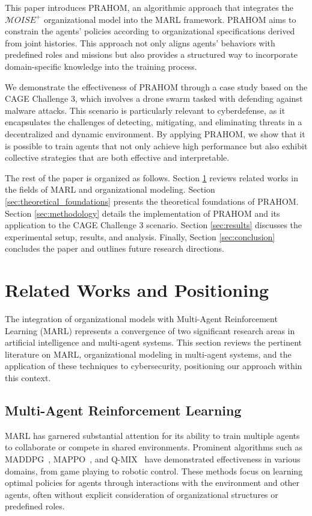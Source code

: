 \documentclass[conference]{IEEEtran}
\begin{document}
This paper introduces PRAHOM, an algorithmic approach that integrates the $\mathcal{M}OISE^+$ organizational model into the MARL framework. PRAHOM aims to constrain the agents' policies according to organizational specifications derived from joint histories. This approach not only aligns agents' behaviors with predefined roles and missions but also provides a structured way to incorporate domain-specific knowledge into the training process.

We demonstrate the effectiveness of PRAHOM through a case study based on the CAGE Challenge 3, which involves a drone swarm tasked with defending against malware attacks. This scenario is particularly relevant to cyberdefense, as it encapsulates the challenges of detecting, mitigating, and eliminating threats in a decentralized and dynamic environment. By applying PRAHOM, we show that it is possible to train agents that not only achieve high performance but also exhibit collective strategies that are both effective and interpretable.

The rest of the paper is organized as follows. Section \ref{sec:related_works} reviews related works in the fields of MARL and organizational modeling. Section \ref{sec:theoretical_foundations} presents the theoretical foundations of PRAHOM. Section \ref{sec:methodology} details the implementation of PRAHOM and its application to the CAGE Challenge 3 scenario. Section \ref{sec:results} discusses the experimental setup, results, and analysis. Finally, Section \ref{sec:conclusion} concludes the paper and outlines future research directions.

\section{Related Works and Positioning}
\label{sec:related_works}

The integration of organizational models with Multi-Agent Reinforcement Learning (MARL) represents a convergence of two significant research areas in artificial intelligence and multi-agent systems. This section reviews the pertinent literature on MARL, organizational modeling in multi-agent systems, and the application of these techniques to cybersecurity, positioning our approach within this context.

\subsection{Multi-Agent Reinforcement Learning}
MARL has garnered substantial attention for its ability to train multiple agents to collaborate or compete in shared environments. Prominent algorithms such as MADDPG~\cite{lowe2017multi}, MAPPO~\cite{yu2022surprising}, and Q-MIX~\cite{rashid2018qmix} have demonstrated effectiveness in various domains, from game playing to robotic control. These methods focus on learning optimal policies for agents through interactions with the environment and other agents, often without explicit consideration of organizational structures or predefined roles.
\end{document}
